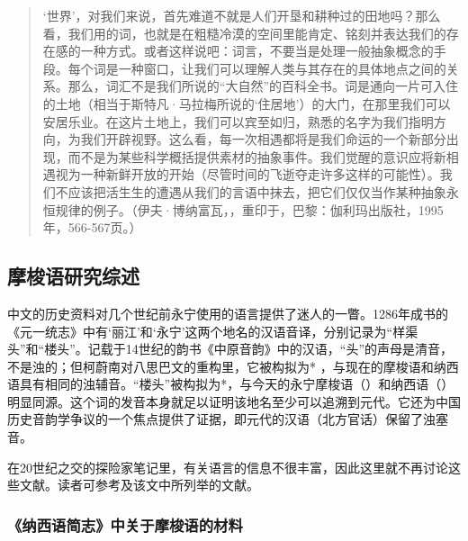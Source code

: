 	\begin{quote}
    ‘世界’，对我们来说，首先难道不就是人们开垦和耕种过的田地吗？那么看，我们用的词，也就是在粗糙冷漠的空间里能肯定、铭刻并表达我们的存在感的一种方式。或者这样说吧：词言，不要当是处理一般抽象概念的手段。每个词是一种窗口，让我们可以理解人类与其存在的具体地点之间的关系。那么，词汇不是我们所说的“大自然”的百科全书。词是通向一片可入住的土地（相当于斯特凡·马拉梅所说的‘住居地’）的大门，在那里我们可以安居乐业。在这片土地上，我们可以宾至如归，熟悉的名字为我们指明方向，为我们开辟视野。这么看，每一次相遇都将是我们命运的一个新部分出现，而不是为某些科学概括提供素材的抽象事件。我们觉醒的意识应将新相遇视为一种新鲜开放的开始（尽管时间的飞逝夺走许多这样的可能性）。我们不应该把活生生的遭遇从我们的言语中抹去，把它们仅仅当作某种抽象永恒规律的例子。（伊夫·博纳富瓦，，重印于，巴黎：伽利玛出版社，1995年，566-567页。）
\end{quote}


\subsection{摩梭语研究综述}
\label{sec:previousstudiesofthenalanguage}


中文的历史资料对几个世纪前永宁使用的语言提供了迷人的一瞥。1286年成书的{《元一统志》}中有‘丽江’和‘永宁’这两个地名的汉语音译，分别记录为“样渠头”和“楼头”。记载于14世纪的韵书{《中原音韵》}中的汉语，“头”的声母是清音，不是浊的；但柯蔚南对八思巴文的重构里，它被构拟为* ，与现在的摩梭语和{纳西}语具有相同的浊辅音\parencite{coblin2007}。“楼头”被构拟为*，与今天的永宁摩梭语（）和{纳西}语（）明显同源。这个词的发音本身就足以证明该地名至少可以追溯到元代。它还为中国历史{音韵学}争议的一个焦点提供了{证据}，即元代的汉语（北方官话）保留了浊塞音\parencite[487]{jacquesetal2011}。

在20世纪之交的探险家笔记里，有关语言的信息不很丰富，因此这里就不再讨论这些文献。读者可参考\textcite{michaudetal2010}及该文中所列举的文献。


\subsubsection{《纳西语简志》中关于摩梭语的材料}
\label{sec:heandjiang1985}

